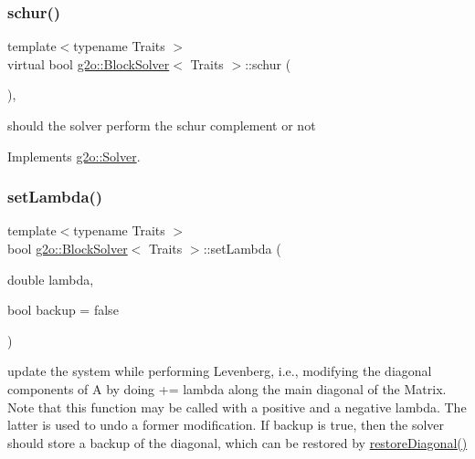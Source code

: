 \subsubsection{\texorpdfstring{schur()}{schur()}}
{\footnotesize\ttfamily template$<$typename Traits $>$ \\
virtual bool \mbox{\hyperlink{classg2o_1_1_block_solver}{g2o\+::\+Block\+Solver}}$<$ Traits $>$\+::schur (\begin{DoxyParamCaption}{ }\end{DoxyParamCaption})\hspace{0.3cm}{\ttfamily [inline]}, {\ttfamily [virtual]}}



should the solver perform the schur complement or not 



Implements \mbox{\hyperlink{classg2o_1_1_solver_acc8d6a8ae7847a157d4a2f44aea14c74}{g2o\+::\+Solver}}.

\mbox{\label{classg2o_1_1_block_solver_acc63a23e5b35e4f72d46dc22719aa56f}} 
\subsubsection{\texorpdfstring{set\+Lambda()}{setLambda()}}
{\footnotesize\ttfamily template$<$typename Traits $>$ \\
bool \mbox{\hyperlink{classg2o_1_1_block_solver}{g2o\+::\+Block\+Solver}}$<$ Traits $>$\+::set\+Lambda (\begin{DoxyParamCaption}\item[{double}]{lambda,  }\item[{bool}]{backup = {\ttfamily false} }\end{DoxyParamCaption})\hspace{0.3cm}{\ttfamily [virtual]}}

update the system while performing Levenberg, i.\+e., modifying the diagonal components of A by doing += lambda along the main diagonal of the Matrix. Note that this function may be called with a positive and a negative lambda. The latter is used to undo a former modification. If backup is true, then the solver should store a backup of the diagonal, which can be restored by \mbox{\hyperlink{classg2o_1_1_block_solver_a2136931d7aa2f54df5207556c4685809}{restore\+Diagonal()}} 

